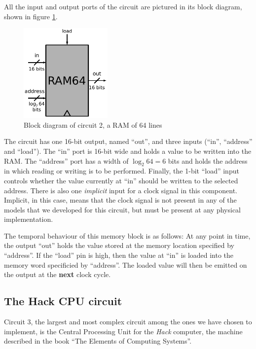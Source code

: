 \documentclass[a4paper]{article}
\begin{document}
            All the input and output ports of the circuit are pictured in its block diagram, shown
            in figure \ref{fig:ram-block}.
            \begin{figure}[h]
                \begin{center}
                    \includegraphics[width=0.4\textwidth]{imgs/ram-block.pdf}
                \end{center}
                \caption{Block diagram of circuit 2, a RAM of 64 lines
                    \label{fig:ram-block}}
            \end{figure}

            The circuit has one 16-bit output, named ``out'', and three inputs (``in'', ``address''
            and ``load''). The ``in'' port is 16-bit wide and holds a value to be written into the
            RAM. The ``address'' port has a width of $\log_{2} 64 = 6$ bits and holds the address
            in which reading or writing is to be performed. Finally, the 1-bit ``load'' input
            controls whether the value currently at ``in'' should be written to the selected
            address. There is also one \emph{implicit} input for a clock signal in this component.
            Implicit, in this case, means that the clock signal is not present in any of the models
            that we developed for this circuit, but must be present at any physical implementation.

            The temporal behaviour of this memory block is as follows: At any point in time, the
            output ``out'' holds the value stored at the memory location specified by ``address''.
            If the ``load'' pin is high, then the value at ``in'' is loaded into the memory word
            specificied by ``address''. The loaded value will then be emitted on the output at the
            \textbf{next} clock cycle.

        \subsection{The Hack CPU circuit}
        \label{subsec:hack-cpu-circuit}
            Circuit 3, the largest and most complex circuit among the ones we have chosen to
            implement, is the Central Processing Unit for the \emph{Hack} computer, the machine
            described in the book ``The Elements of Computing Systems''\cite{nand2tetris-book}.
\end{document}

